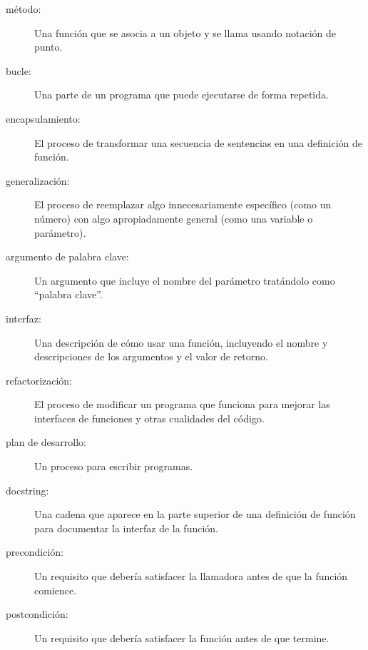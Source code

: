 \documentclass[10pt]{book}
\begin{document}
\begin{description}

\item[método:] Una función que se asocia a un objeto y se llama
usando notación de punto.

\item[bucle:] Una parte de un programa que puede ejecutarse de forma repetida.

\item[encapsulamiento:] El proceso de transformar una secuencia de
sentencias en una definición de función.

\item[generalización:] El proceso de reemplazar algo
innecesariamente específico (como un número) con algo apropiadamente
general (como una variable o parámetro).

\item[argumento de palabra clave:] Un argumento que incluye el nombre del
parámetro tratándolo como ``palabra clave''.

\item[interfaz:] Una descripción de cómo usar una función, incluyendo
el nombre y descripciones de los argumentos y el valor de retorno.

\item[refactorización:] El proceso de modificar un programa que funciona para
  mejorar las interfaces de funciones y otras cualidades del código.

\item[plan de desarrollo:] Un proceso para escribir programas.

\item[docstring:] Una cadena que aparece en la parte superior de una definición
  de función para documentar la interfaz de la función.

\item[precondición:] Un requisito que debería satisfacer la
llamadora antes de que la función comience.

\item[postcondición:] Un requisito que debería satisfacer la
función antes de que termine.

\end{description}
\end{document}
